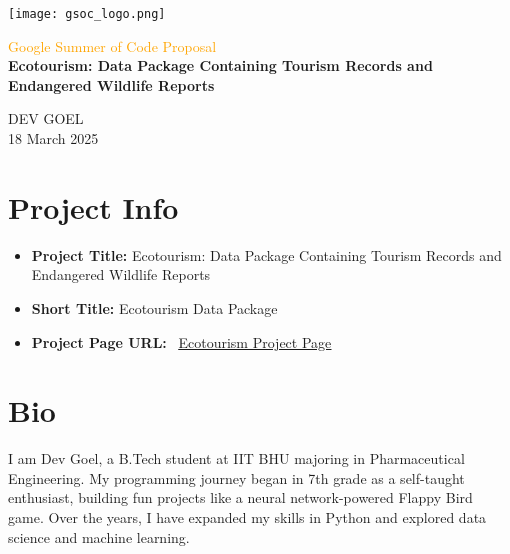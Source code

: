 \documentclass{article}
\begin{document}
\fontsize{13.2}{15}\selectfont 

\begin{titlepage}
    \centering
    \vspace*{4cm}
    
    \begin{center}
        \texttt{[image: gsoc\_logo.png]} \hspace{1.5cm}
    \end{center}
    
    \vspace{1.5cm}
    
    {\fontsize{22}{34}\selectfont \textcolor{orange}{Google Summer of Code Proposal}}\\[1.5cm]
    {\fontsize{30}{60}\selectfont\baselineskip=1.2cm
        \bfseries
        Ecotourism: Data Package Containing Tourism Records and Endangered Wildlife Reports\\
    }

    
    \vfill
    
    {\large DEV GOEL}\\
    \vspace{0.2cm}
    {\large 18 March 2025}

\end{titlepage}

\newpage


\tableofcontents
\newpage

\section{Project Info}
\begin{itemize}
    \item \textbf{Project Title:} Ecotourism: Data Package Containing Tourism Records and Endangered Wildlife Reports
    \item \textbf{Short Title:} Ecotourism Data Package
    \item \textbf{Project Page URL: } \faLink~{\uline{\href{https://github.com/rstats-gsoc/gsoc2025/wiki/ecotourism:-data-package-containing-tourism-records-and-endangered-wildlife-reports}{Ecotourism Project Page}}}
\end{itemize}


\section{Bio}
I am Dev Goel, a B.Tech student at IIT BHU majoring in Pharmaceutical Engineering. My programming journey began in 7th grade as a self-taught enthusiast, building fun projects like a neural network-powered Flappy Bird game. Over the years, I have expanded my skills in Python and explored data science and machine learning. \\
\end{document}
